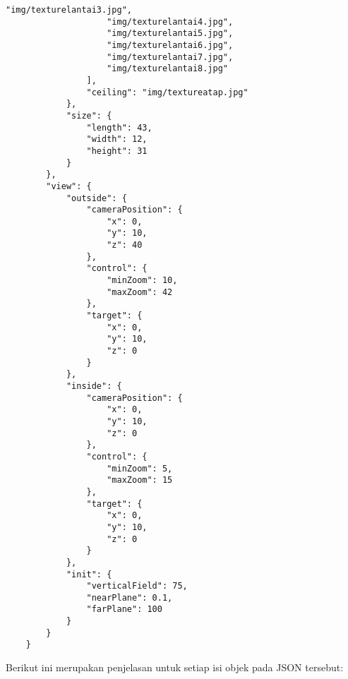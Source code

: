 \begin{lstlisting}[caption={Contoh JSON untuk ruangan kelas pada saat ujian.}, label={lst:json},captionpos=b]
                    "img/texturelantai3.jpg",
                    "img/texturelantai4.jpg",
                    "img/texturelantai5.jpg",
                    "img/texturelantai6.jpg",
                    "img/texturelantai7.jpg",
                    "img/texturelantai8.jpg"
                ],
                "ceiling": "img/textureatap.jpg"
            },
            "size": {
                "length": 43,
                "width": 12,
                "height": 31
            }
        },
        "view": {
            "outside": {
                "cameraPosition": {
                    "x": 0,
                    "y": 10,
                    "z": 40
                },
                "control": {
                    "minZoom": 10,
                    "maxZoom": 42
                },
                "target": {
                    "x": 0,
                    "y": 10,
                    "z": 0
                }
            },
            "inside": {
                "cameraPosition": {
                    "x": 0,
                    "y": 10,
                    "z": 0
                },
                "control": {
                    "minZoom": 5,
                    "maxZoom": 15
                },
                "target": {
                    "x": 0,
                    "y": 10,
                    "z": 0
                }
            },
            "init": {
                "verticalField": 75,
                "nearPlane": 0.1,
                "farPlane": 100
            }
        } 
    }
\end{lstlisting}
Berikut ini merupakan penjelasan untuk setiap isi objek pada JSON tersebut:
